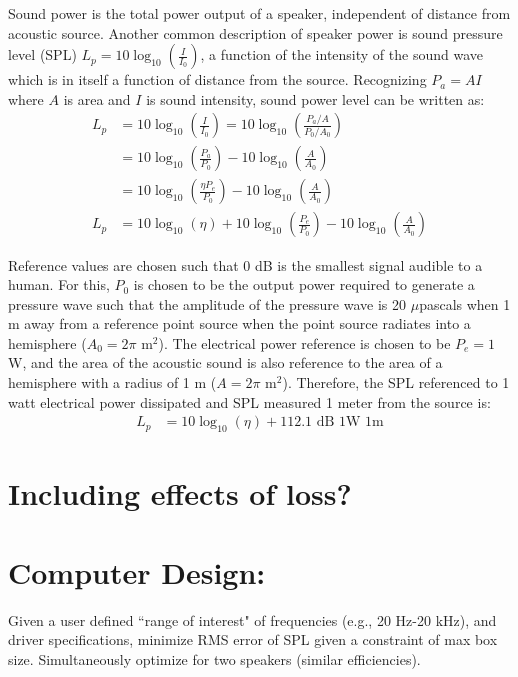 \documentclass[10pt]{book}
\begin{document}
Sound power is the total power output of a speaker, independent of distance from acoustic source. Another common description of speaker power is sound pressure level (SPL) $L_p=10\log_10\left( \frac{I}{I_0} \right)$, a function of the intensity of the sound wave which is in itself a function of distance from the source. Recognizing $P_a=AI$ where $A$ is area and $I$ is sound intensity, sound power level can be written as:
\begin{align}
L_p&=10\log_10\left( \frac{I}{I_0} \right) = 10\log_{10}\left( \frac{P_a/A}{P_0/A_0} \right)\\
&=10\log_{10}\left( \frac{P_a}{P_0}\right) -10\log_{10} \left( \frac{A}{A_0} \right)\\
&=10\log_{10}\left( \frac{\eta P_e}{P_0}\right) -10\log_{10} \left( \frac{A}{A_0} \right)\\
L_p&=10\log_{10}\left( \eta \right)+10\log_{10}\left( \frac{P_e}{P_0}\right) -10\log_{10} \left( \frac{A}{A_0} \right)
\end{align}

Reference values are chosen such that 0 dB is the smallest signal audible to a human. For this, $P_0$ is chosen to be the output power required to generate a pressure wave such that the amplitude of the pressure wave is 20 $\mu$pascals when 1 m away from a reference point source when the point source radiates into a hemisphere ($A_0=2\pi$ m$^2$). The electrical power reference is chosen to be $P_e=1$ W, and the area of the acoustic sound is also reference to the area of a hemisphere with a radius of 1 m ($A=2\pi$ m$^2$). Therefore, the SPL referenced to 1 watt electrical power dissipated and SPL measured 1 meter from the source is:
\begin{align}
L_p&=10\log_{10}\left( \eta \right)+112.1 \mbox{ dB 1W 1m}
\end{align}


\section{Including effects of loss?}

\section{Computer Design:} Given a user defined ``range of interest" of frequencies (e.g., 20 Hz-20 kHz), and driver specifications, minimize RMS error of SPL given a constraint of max box size. Simultaneously optimize for two speakers (similar efficiencies).
\end{document}
